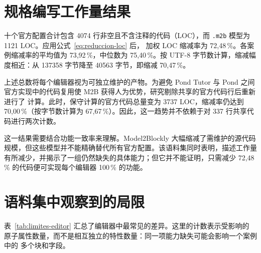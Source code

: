\section{规格编写工作量结果}
\label{sec:resultados-esfuerzo}

十个官方配置合计包含 4074 行非空且不含注释的代码（LOC），而
\texttt{.m2b} 模型为 1121 LOC。应用公式~\ref{eq:reduccion-loc} 后，
加权 LOC 缩减率为 72,48\,\%。各案例缩减率的平均值为 73,92\,\%，中位数为
75,40\,\%。按 UTF-8 字节数计算，缩减幅度相近：从 137358 字节降至
40563 字节，即缩减 70,47\,\%。

上述总数将每个编辑器视为可独立维护的产物。为避免 Pond Tutor 与 Pond
之间官方实现中的代码复用使 M2B 获得人为优势，研究剔除共享的官方代码行后重新进行了
计算。此时，保守计算的官方代码总量变为 3737 LOC，缩减率仍达到
70,00\,\%（按字节数计算为 67,67\,\%）。因此，这一趋势并不依赖于对
337 行共享代码进行两次计数。

这一结果需要结合功能一致率来理解。Model2Blockly 大幅缩减了需维护的源代码
规模，但这些模型并不能精确替代所有官方配置。该语料集同时表明，描述工作量
有所减少，并揭示了一组仍然缺失的具体能力；但它并不能证明，只需减少
72,48\,\% 的代码便可实现每个编辑器 100\,\% 的功能。

\section{语料集中观察到的局限}
\label{sec:limites-corpus}

表~\ref{tab:limites-editor} 汇总了编辑器中最常见的差异。这里的计数表示受影响的
原子属性数量，而不是相互独立的特性数量：同一项能力缺失可能会影响一个案例中的
多个块和字段。

\begin{table}[htbp]
  \centering
  \caption{造成主要差异的编辑器能力}
  \label{tab:limites-editor}
\end{table}

